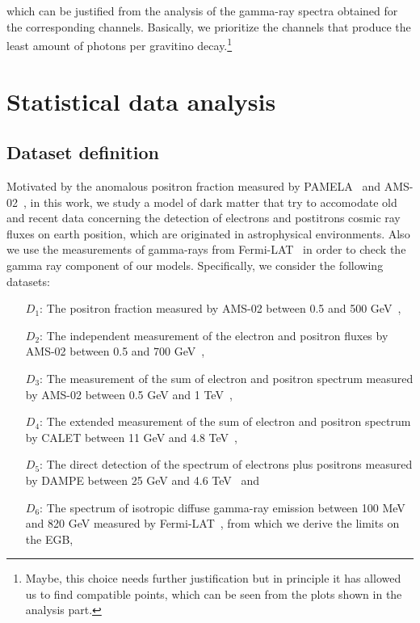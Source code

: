 \documentclass[a4paper,11pt]{article}
\begin{document}
\noindent which can be justified from the analysis of the gamma-ray spectra obtained for the corresponding channels. Basically,
we prioritize the channels that produce the least amount of photons per gravitino decay.\footnote{Maybe, this choice needs further justification but in principle it has allowed us to find compatible points, which can be seen from the plots shown in the analysis part.} 

\section{Statistical data analysis}
\label{sec:stats}

\subsection{Dataset definition}

Motivated by the anomalous positron fraction measured by PAMELA~\cite{Adriani:2008zr} and AMS-02~\cite{Accardo:2014lma}, in this work, we study a model of dark matter that try to accomodate old and recent data concerning the detection of electrons and postitrons cosmic ray fluxes on earth position, which are originated in astrophysical environments. Also we use the measurements of gamma-rays from Fermi-LAT~\cite{Ackermann:2014usa} in order to check the gamma ray component of our models. Specifically, we consider the following datasets:

\begin{itemize}
\item[$D_1$:] The positron fraction measured by AMS-02 between 0.5 and 500 GeV~\cite{Accardo:2014lma},
\item[$D_2$:] The independent measurement of the electron and positron fluxes by AMS-02 between 0.5 and 700 GeV~\cite{Aguilar:2014mma},
\item[$D_3$:] The measurement of the sum of electron and positron spectrum measured by AMS-02 between 0.5 GeV and 1 TeV~\cite{Aguilar:2014fea},
\item[$D_4$:] The extended measurement of the sum of electron and positron spectrum by CALET between 11 GeV and 4.8 TeV~\cite{Adriani:2018ktz},
\item[$D_5$:] The direct detection of the spectrum of electrons plus positrons measured by DAMPE between 25 GeV and 4.6 TeV~\cite{Ambrosi:2017wek} and
\item[$D_6$:] The spectrum of isotropic diffuse gamma-ray emission between 100 MeV and 820 GeV measured by Fermi-LAT~\cite{Ackermann:2014usa}, from which we derive the limits on the EGB,
\end{itemize}
 
\end{document}
